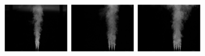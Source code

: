 \documentclass{jfm}
\begin{document}
	 \begin{figure}
		\centering
			\includegraphics[trim = {5cm 0 5cm 2cm},clip,width =0.3\textwidth, height = 10cm]{twoNozzleInstantaneousExample.eps}
			\includegraphics[trim = {6.5cm 0cm 4.5cm 2cm},clip,width = 0.3\textwidth,height = 10cm]{threeNozzleInstantaneousExample.eps}
			\includegraphics[trim = {6.5cm 0 4.5cm 2cm},clip,width = 0.3\textwidth,height = 10cm]{fourNozzleInstantaneousExample.eps}

\end{figure}
\end{document}
